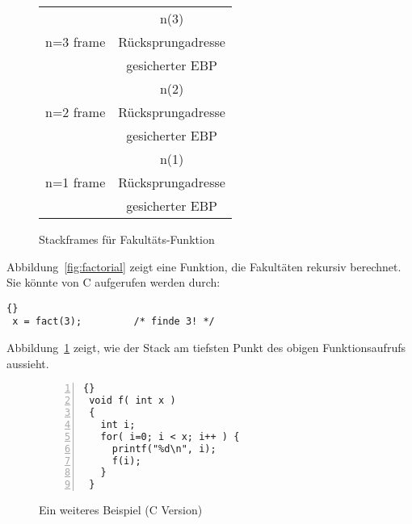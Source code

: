 \begin{figure}[t]
\centering
\begin{tabular}{l|c|}
 \cline{2-2}           & n(3) \\
 \cline{2-2} n=3 frame & R\"{u}cksprungadresse \\
 \cline{2-2}           & gesicherter EBP \\
 \cline{2-2}           & n(2) \\
 \cline{2-2} n=2 frame & R\"{u}cksprungadresse \\
 \cline{2-2}           & gesicherter EBP \\
 \cline{2-2}           & n(1) \\
 \cline{2-2} n=1 frame & R\"{u}cksprungadresse \\
 \cline{2-2}           & gesicherter EBP \\
 \cline{2-2}
\end{tabular}
\caption{Stackframes f\"{u}r Fakult\"{a}ts-Funktion} 
\label{fig:factStack}
\end{figure}
%

Abbildung~\ref{fig:factorial} zeigt eine Funktion, die Fakult\"{a}ten
rekursiv berechnet. Sie k\"{o}nnte von C aufgerufen werden durch:
\begin{lstlisting}[stepnumber=0]{}
 x = fact(3);         /* finde 3! */
\end{lstlisting}
Abbildung~\ref{fig:factStack} zeigt, wie der Stack am tiefsten Punkt
des obigen Funktionsaufrufs aussieht.

\begin{figure}[t]
\begin{lstlisting}[frame=tlrb, numbers=left]{}
 void f( int x )
 {
   int i;
   for( i=0; i < x; i++ ) {
     printf("%d\n", i);
     f(i);
   }
 }
\end{lstlisting}
\caption{Ein weiteres Beispiel (C Version) \label{fig:rec2C}}
\end{figure}

